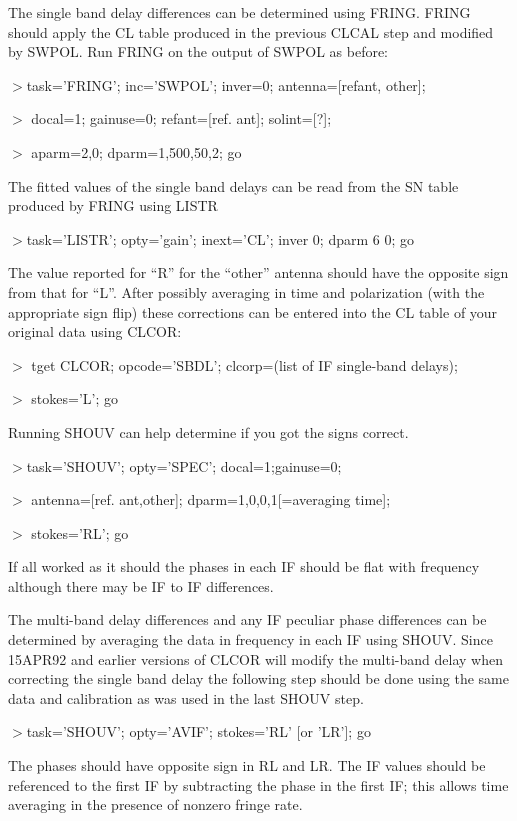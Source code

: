 \begin{enumerate}
   The single band delay differences can be determined using FRING.
FRING should apply the CL table produced  in the previous CLCAL step
and modified by SWPOL.  Run FRING on the output of SWPOL
as before:
\par\noindent
$>$task='FRING'; inc='SWPOL'; inver=0; antenna=[refant, other];
\par\noindent
$>$ docal=1; gainuse=0; refant=[ref. ant]; solint=[?];
\par\noindent
$>$ aparm=2,0; dparm=1,500,50,2; go

   The fitted values of the single band delays can be read from the SN
table produced by FRING using LISTR
\par\noindent
$>$task='LISTR'; opty='gain'; inext='CL'; inver 0; dparm 6 0; go
\par\noindent
The value reported for ``R'' for the ``other'' antenna should have the
opposite sign from that for ``L''.  After possibly averaging in time
and polarization (with the appropriate sign flip) these corrections
can be entered into the CL table of your original data using CLCOR:

\par\noindent
$>$ tget CLCOR; opcode='SBDL'; clcorp=(list of IF single-band delays);
\par\noindent
$>$ stokes='L'; go

Running SHOUV can help determine if you got the signs correct.
\par\noindent
$>$task='SHOUV'; opty='SPEC'; docal=1;gainuse=0;
\par\noindent
$>$ antenna=[ref. ant,other]; dparm=1,0,0,1[=averaging time];
\par\noindent
$>$ stokes='RL'; go
\par\noindent
If all worked as it should the phases in each IF should be flat with
frequency although there may be IF to IF differences.

   The multi-band delay differences and any IF peculiar phase
differences can be determined by averaging the data in frequency in
each IF using SHOUV.  Since 15APR92 and earlier versions of CLCOR will
modify the multi-band delay when correcting the single band delay the
following step should be done using the same data and calibration as
was used in the last SHOUV step.
\par\noindent
$>$task='SHOUV'; opty='AVIF'; stokes='RL' [or 'LR']; go
\par\noindent
The phases should have opposite sign in RL and LR.  The IF values
should be referenced to the first IF by subtracting the phase in the
first IF; this allows time averaging in the presence of nonzero fringe
rate.


\end{enumerate}
